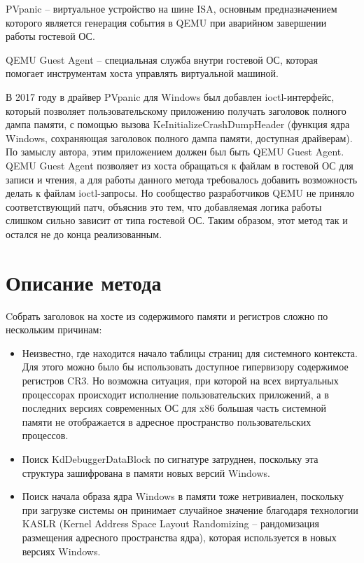 \documentclass{mipt-thesis-bs}
\begin{document}
PVpanic -- виртуальное устройство на шине ISA, основным предназначением которого является генерация события в QEMU при аварийном завершении работы гостевой ОС.

QEMU Guest Agent -- специальная служба внутри гостевой ОС, которая помогает инструментам хоста управлять виртуальной машиной.

В 2017 году в драйвер PVpanic для Windows был добавлен ioctl-интерфейс, который позволяет пользовательскому приложению получать заголовок полного дампа памяти, с помощью вызова KeInitializeCrashDumpHeader (функция ядра Windows, сохраняющая заголовок полного дампа памяти, доступная драйверам\cite{kicdh}). По замыслу автора, этим приложением должен был быть QEMU Guest Agent. QEMU Guest Agent позволяет из хоста обращаться к файлам в гостевой ОС для записи и чтения, а для работы данного метода требовалось добавить возможность делать к файлам ioctl-запросы. Но сообщество разработчиков QEMU не приняло соответствующий патч, объяснив это тем, что добавляемая логика работы слишком сильно зависит от типа гостевой ОС.
Таким образом, этот метод так и остался не до конца реализованным.

\chapter{Описание метода}

Cобрать заголовок на хосте из содержимого памяти и регистров сложно по нескольким причинам:

\begin{itemize}
\item Неизвестно, где находится начало таблицы страниц для системного контекста. Для этого можно было бы использовать доступное гипервизору содержимое регистров CR3. Но возможна ситуация, при которой на всех виртуальных процессорах происходит исполнение пользовательских приложений, а в последних версиях современных ОС для x86 большая часть системной памяти не отображается в адресное пространство пользовательских процессов.
\item Поиск KdDebuggerDataBlock по сигнатуре затруднен, поскольку эта структура зашифрована в памяти новых версий Windows.
\item Поиск начала образа ядра Windows в памяти тоже нетривиален, поскольку при загрузке системы он принимает случайное значение благодаря технологии KASLR (Kernel Address Space Layout Randomizing -- рандомизация размещения адресного пространства ядра), которая используется в новых версиях Windows.
\end{itemize}
\end{document}
